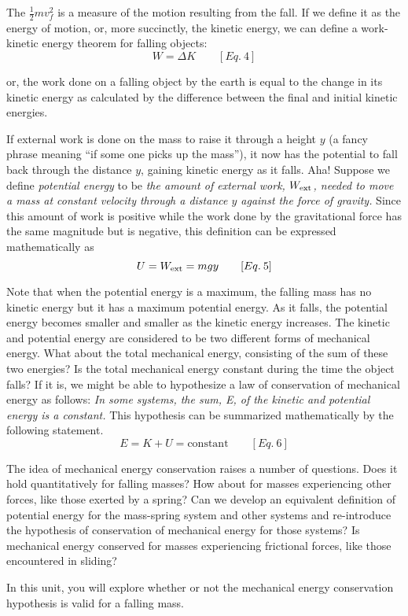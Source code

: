 The \(\frac{1}{2}mv_{f}^{2} \) is a measure of the motion resulting from the fall.
If we define it as the energy of motion, or, more succinctly, the kinetic 
energy, we can define a work-kinetic energy theorem for falling objects:
\[
W=\Delta K\qquad [Eq.\: 4]\]


or, the work done on a falling object by the earth is equal to the change in
its kinetic energy as calculated by the difference between the final and initial
kinetic energies.

If external work is done on the mass to raise it through a height $y$ (a fancy
phrase meaning ``if some one picks up the mass''), it now has
the potential to fall back through the distance $y$, gaining kinetic energy as
it falls. Aha! Suppose we define \textit{potential energy} to be \textit{the
amount of external work, \( W_{\rm ext} \), needed to move a mass at constant velocity
through a distance $y$ against the force of gravity.} Since this amount of work
is positive while the work done by the gravitational force has the same magnitude
but is negative, this definition can be expressed mathematically as
\[
U=W_{\rm ext}=mgy\qquad [Eq.\: 5]\]


Note that when the potential energy is a maximum, the falling mass has no kinetic
energy but it has a maximum potential energy. As it falls, the potential energy
becomes smaller and smaller as the kinetic energy increases. The kinetic and
potential energy are considered to be two different forms of mechanical energy.
What about the total mechanical energy, consisting of the sum of these two energies?
Is the total mechanical energy constant during the time the object falls? If
it is, we might be able to hypothesize a law of conservation of mechanical energy
as follows: \textit{In some systems, the sum, E, of the kinetic and potential
energy is a constant.} This hypothesis can be summarized mathematically by the
following statement.
\[
E=K+U=\mbox{constant}\qquad [Eq.\: 6]\]


The idea of mechanical energy conservation raises a number of questions. Does
it hold quantitatively for falling masses? How about for masses experiencing
other forces, like those exerted by a spring? Can we develop an equivalent definition
of potential energy for the mass-spring system and other systems and re-introduce
the hypothesis of conservation of mechanical energy for those systems? Is mechanical
energy conserved for masses experiencing frictional forces, like those encountered
in sliding?

In this unit, you will explore whether or not the mechanical energy conservation
hypothesis is valid for a falling mass.

